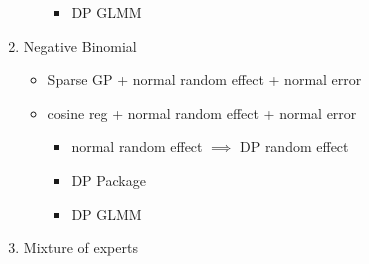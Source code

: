 \documentclass[11pt]{article}
\begin{document}
\begin{enumerate}
\begin{itemize}
\begin{itemize}
      \item DP GLMM
    \end{itemize}
  \end{itemize}
  \item Negative Binomial \begin{itemize}
    \item Sparse GP + normal random effect + normal error
    \item cosine reg + normal random effect + normal error \begin{itemize}
      \item normal random effect $\implies$ DP random effect
      \item DP Package
      \item DP GLMM
    \end{itemize}
  \end{itemize}
  \item Mixture of experts
\end{enumerate}
\end{document}
